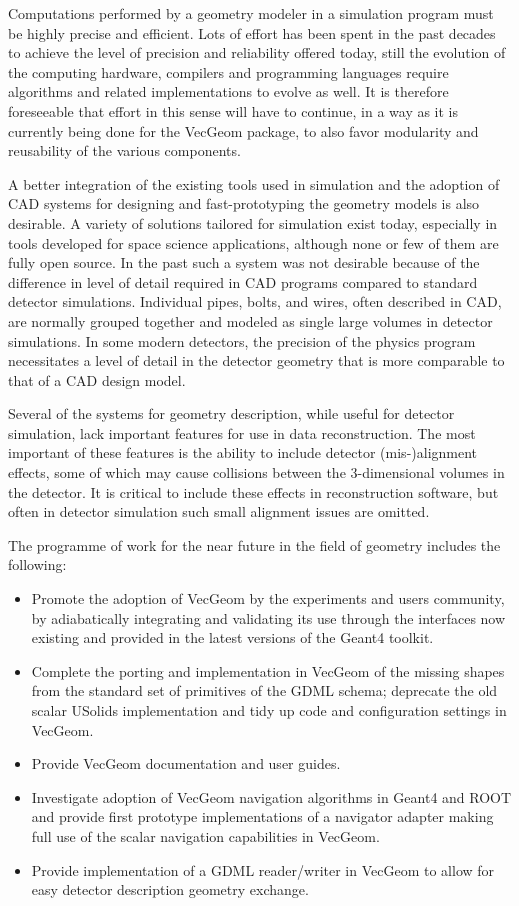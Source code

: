 \documentclass[12pt,a4paper]{article}
\begin{document}
Computations performed by a geometry modeler in a simulation program
must be highly precise and efficient. Lots of effort has been spent in
the past decades to achieve the level of precision and reliability
offered today, still the evolution of the computing hardware, compilers
and programming languages require algorithms and related implementations
to evolve as well. It is therefore foreseeable that effort in this sense
will have to continue, in a way as it is currently being done for the
VecGeom package, to also favor modularity and reusability of the various
components.

A better integration of the existing tools used in simulation and the
adoption of CAD systems for designing and fast-prototyping the geometry
models is also desirable. A variety of solutions tailored for simulation
exist today, especially in tools developed for space science
applications, although none or few of them are fully open source. In the
past such a system was not desirable because of the difference in level
of detail required in CAD programs compared to standard detector
simulations. Individual pipes, bolts, and wires, often described in CAD,
are normally grouped together and modeled as single large volumes in
detector simulations. In some modern detectors, the precision of the
physics program necessitates a level of detail in the detector geometry
that is more comparable to that of a CAD design model.

Several of the systems for geometry description, while useful for
detector simulation, lack important features for use in data
reconstruction. The most important of these features is the ability to
include detector (mis-)alignment effects, some of which may cause
collisions between the 3-dimensional volumes in the detector. It is
critical to include these effects in reconstruction software, but often
in detector simulation such small alignment issues are omitted.

The programme of work for the near future in the field of geometry
includes the following:

\begin{itemize}
\item
  Promote the adoption of VecGeom by the experiments and users
  community, by adiabatically integrating and validating its use through
  the interfaces now existing and provided in the latest versions of the
  Geant4 toolkit.
\item
  Complete the porting and implementation in VecGeom of the missing
  shapes from the standard set of primitives of the GDML schema;
  deprecate the old scalar USolids implementation and tidy up code and
  configuration settings in VecGeom.
\item
  Provide VecGeom documentation and user guides.
\item
  Investigate adoption of VecGeom navigation algorithms in Geant4 and
  ROOT and provide first prototype implementations of a navigator
  adapter making full use of the scalar navigation capabilities in
  VecGeom.
\item
  Provide implementation of a GDML reader/writer in VecGeom to allow for
  easy detector description geometry exchange.
\end{itemize}
\end{document}
